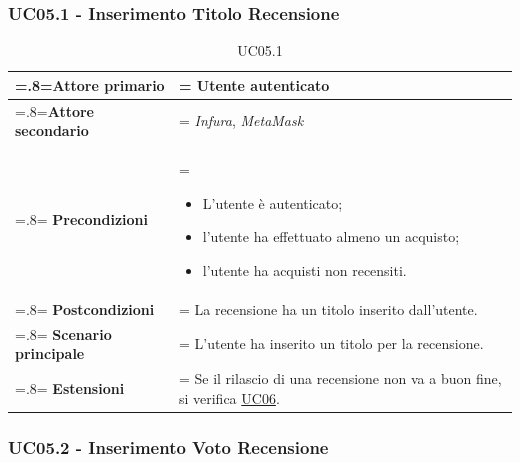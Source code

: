             \subsubsection{UC05.1 - Inserimento Titolo Recensione}
            \label{UC05.1}

                \begin{table}[H]
                    \centering
                    \renewcommand{\arraystretch}{1.8}
                    \renewcommand\tabularxcolumn[1]{m{#1}}
                    \begin{tabularx}{0.9\textwidth}{
                        >{\hsize=.8\hsize\linewidth=\hsize}X
                        >{\hsize=1.2\hsize\linewidth=\hsize}X}
                        \hline
                        \textbf{Attore primario} & Utente autenticato \\
                        \hline
                        \textbf{Attore secondario} & \textit{Infura}, \textit{MetaMask} \\
                        \hline
                        \textbf{Precondizioni} &
                            \begin{itemize}
                                \item L'utente è autenticato;
                                \item l'utente ha effettuato almeno un acquisto;
                                \item l'utente ha acquisti non recensiti.
                            \end{itemize} \\
                        \hline
                        \textbf{Postcondizioni} & La recensione ha un titolo inserito dall'utente. \\
                        \hline
                        \textbf{Scenario principale} &
                        L'utente ha inserito un titolo per la recensione. \\
                        \hline
                        \textbf{Estensioni} & Se il rilascio di una recensione non va a buon fine, si verifica \hyperref[UC06]{UC06}. \\
                        \hline
                    \end{tabularx}
                    \caption{UC05.1}
                \end{table}

            \subsubsection{UC05.2 - Inserimento Voto Recensione}
            \label{UC05.2}

